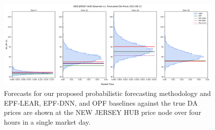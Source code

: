 \begin{figure}[htbp]
    \caption[Comparison of forecasts at select market-hours]{
        Forecasts for our proposed probabilistic forecasting methodology and EPF-LEAR, EPF-DNN, and OPF baselines
        against the true DA prices are shown at the NEW JERSEY HUB price node over four hours in a single market day.
    }
    \begin{center}
        \setlength{\fboxsep}{0pt}%
        \setlength{\fboxrule}{1pt}%
        \includegraphics[width=150mm]{figs/nj_hub_densities}
    \end{center}
    \label{fig:univar_dens}
\end{figure}
